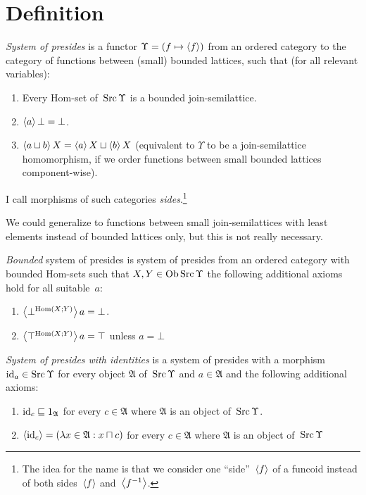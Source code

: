 
\section{Definition}

\begin{defn}
\emph{System of presides} is
a functor $\Upsilon = (f\mapsto\left\langle f\right\rangle)$ from an ordered category
to the category of functions between (small) bounded lattices,
such that (for all relevant variables):
\begin{enumerate}
  \item Every Hom-set of~$\operatorname{Src}\Upsilon$ is a bounded join-semilattice.

  \item $\left\langle a\right\rangle\bot = \bot$.

  \item $\left\langle a \sqcup b\right\rangle X = \left\langle a\right\rangle X \sqcup \left\langle b\right\rangle X$ (equivalent to $\Upsilon$ to be a join-semilattice homomorphism,
    if we order functions between small bounded lattices component-wise).
\end{enumerate}
I call morphisms of such categories \emph{sides}.\footnote{The idea for the name is that we consider one ``side''~$\left\langle f\right\rangle$ of a funcoid instead of both sides~$\left\langle f\right\rangle$ and~$\left\langle f^{-1}\right\rangle$.}
\end{defn}

\begin{rem}
We could generalize to functions between small join-semilattices with least elements instead of bounded lattices only, but this is not really necessary.
\end{rem}

\begin{defn}
\emph{Bounded} system of presides is system of presides from an ordered category with bounded Hom-sets
such that $X,Y\in\operatorname{Ob}\operatorname{Src}\Upsilon$ the following additional axioms hold for all suitable~$a$:
\begin{enumerate}
  \item $\left\langle \bot^{\operatorname{Hom}(X;Y)}\right\rangle a = \bot$.

  \item $\left\langle \top^{\operatorname{Hom}(X;Y)}\right\rangle a = \top$ unless $a = \bot$
\end{enumerate}
\end{defn}

\begin{defn}
\emph{System of presides with identities} is a system of presides with
a morphism $\operatorname{id}_a\in\operatorname{Src}\Upsilon$ for every object $\mathfrak{A}$ of~$\operatorname{Src}\Upsilon$ and $a\in\mathfrak{A}$
and the following additional axioms:
\begin{enumerate}
  \item $\operatorname{id}_c \sqsubseteq 1_{\mathfrak{A}}$ for every $c \in \mathfrak{A}$
    where $\mathfrak{A}$ is an object of~$\operatorname{Src}\Upsilon$.

  \item $\left\langle \operatorname{id}_c\right\rangle = (\lambda x \in \mathfrak{A}: x \sqcap c)$ for every $c \in \mathfrak{A}$
    where $\mathfrak{A}$ is an object of~$\operatorname{Src}\Upsilon$
\end{enumerate}
\end{defn}


